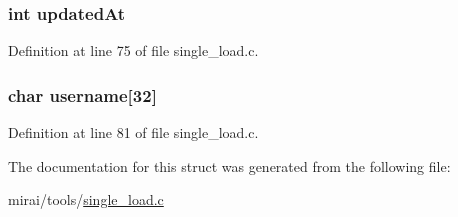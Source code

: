 \subsubsection[{\texorpdfstring{updated\+At}{updatedAt}}]{\setlength{\rightskip}{0pt plus 5cm}int updated\+At}\hypertarget{structstate_slot__t_a019e1e0b8ff724d1efe0a7440c26fd4e}{}\label{structstate_slot__t_a019e1e0b8ff724d1efe0a7440c26fd4e}


Definition at line 75 of file single\+\_\+load.\+c.

\subsubsection[{\texorpdfstring{username}{username}}]{\setlength{\rightskip}{0pt plus 5cm}char username\mbox{[}32\mbox{]}}\hypertarget{structstate_slot__t_a3a2730751a4fbaa66b4ab1fb3fb7fcba}{}\label{structstate_slot__t_a3a2730751a4fbaa66b4ab1fb3fb7fcba}


Definition at line 81 of file single\+\_\+load.\+c.



The documentation for this struct was generated from the following file\+:\begin{DoxyCompactItemize}
\item 
mirai/tools/\hyperlink{single__load_8c}{single\+\_\+load.\+c}\end{DoxyCompactItemize}
